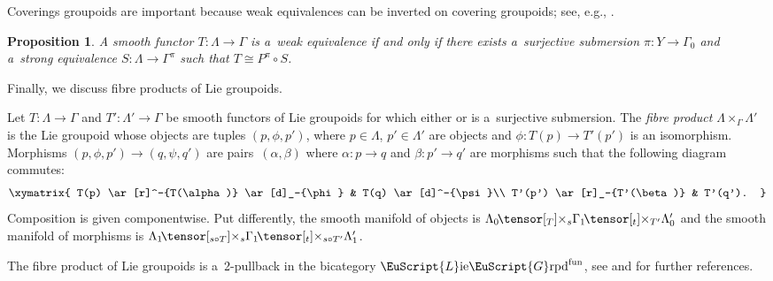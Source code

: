 \documentclass[pdftex]{sigma}
\numberwithin{equation}{section}
\newtheorem{Proposition}[Theorem]{Proposition}
 { \theoremstyle{definition}
\newtheorem{Definition}[Theorem]{Definition}
\newtheorem{Example}[Theorem]{Example}
\newtheorem{Remark}[Theorem]{Remark} }
\def\mathscr#1{\EuScript{#1}}
\def\liegrpd{\mathscr{L}\text{ie}\mathscr{G}\text{rpd}}
\def\ttimes#1#2{\hspace{-0.15em}\tensor[_{#1}]{\times}{_{#2}}}
\newcommand{\pr}{\operatorname{pr}}
\begin{document}
Coverings groupoids are important because weak equivalences can be inverted on covering groupoids; see, e.g., \cite[Proposition 5.7]{nikolaus2}.
\begin{Proposition} \label{Lemma: Extracting covering groupoids from weak equivalences}
 A smooth functor $T \colon \Lambda \to \Gamma$ is a~weak equivalence if and only if there exists a~surjective submersion $\pi \colon Y \to \Gamma_0$ and a~strong equivalence
 $S \colon \Lambda \to \Gamma^\pi$ such that $T \cong P^{\pi} \circ S$.
\end{Proposition}

Finally, we discuss fibre products of Lie groupoids.

\begin{Definition}
\label{definition: fibre product of Lie groupoids}
 Let $T\colon \Lambda \to \Gamma$ and $T' \colon \Lambda' \to \Gamma$ be smooth functors of Lie groupoids for which either
 \smash{$t \circ \pr_{\Gamma_1} \colon \Lambda_0 \ttimes{T_0}{s} \Gamma_1 \to \Gamma_0$} or \smash{$s \circ \pr_{\Gamma_1} \colon \Lambda_0' \ttimes{T_0'}{t} \Gamma_1 \to \Gamma_0$}
 is a~surjective submersion. The \emph{fibre product} $\Lambda \times_{\Gamma} \Lambda'$
 is the Lie groupoid whose objects are tuples $(p,\phi,p')$, where $p \in \Lambda$, $p' \in \Lambda'$ are objects and $\phi \colon T(p) \to T'(p')$ is an isomorphism.
 Morphisms $(p,\phi,p') \to (q,\psi,q')$ are pairs~${(\alpha,\beta)}$ where $\alpha \colon p \to q$ and $\beta\colon p' \to q'$ are morphisms such that
 the following diagram commutes:
 \begin{equation*}
 \xymatrix{
 T(p) \ar[r]^-{T(\alpha)} \ar[d]_-{\phi} & T(q) \ar[d]^-{\psi}\\
 T'(p') \ar[r]_-{T'(\beta)} & T'(q').
 }
 \end{equation*}
 Composition is given componentwise. Put differently, the smooth manifold of objects is $\Lambda_0 \ttimes{T}{s} \Gamma_1 \ttimes{t}{T'} \Lambda_0'$ and
 the smooth manifold of morphisms is $\Lambda_1 \ttimes{s \circ T}{s} \Gamma_1 \ttimes{t}{s \circ T'} \Lambda_1'$.

\end{Definition}
\begin{Remark}\label{Remark: the fibre product is a 2-pullback}
 The fibre product of Lie groupoids is a~2-pullback in the bicategory $\liegrpd^{\rm fun}$, see \cite[Section~5.3]{Moerdijk2003foliations} and
 \cite[Remark 1.18]{DuLi2014} for further references.
\end{Remark}
\end{document}
